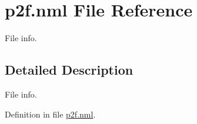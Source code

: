 \hypertarget{p2f_8nml}{
\section{p2f.nml File Reference}
\label{p2f_8nml}
}
File info.  




\label{_details}
\hypertarget{_details}{}
\subsection{Detailed Description}
File info. 



Definition in file \hyperlink{p2f_8nml_source}{p2f.nml}.